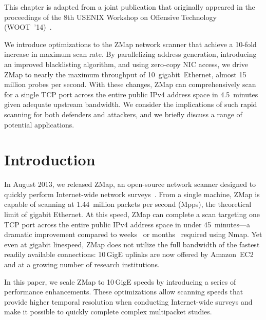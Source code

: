 
This chapter is adapted from a joint publication that originally appeared in
the proceedings of the 8th USENIX Workshop on Offensive Technology
(WOOT~'14)~\cite{zippier-zmap-2014}.

We introduce optimizations to the ZMap network scanner that achieve a 10-fold
increase in maximum scan rate. By parallelizing address generation,
introducing an improved blacklisting algorithm, and using zero-copy NIC
access, we drive ZMap to nearly the maximum throughput of
10~gigabit~Ethernet, almost 15 million probes per second. With these changes,
ZMap can comprehensively scan for a single TCP port across the entire public
IPv4 address space in 4.5~minutes given adequate upstream bandwidth. We
consider the implications of such rapid scanning for both defenders and
attackers, and we briefly discuss a range of potential applications.

\section{Introduction}
\label{sec:introduction}

In August 2013, we released ZMap, an open-source network scanner designed to
quickly perform Internet-wide network surveys~\cite{zmap-2013}. From a single
machine, ZMap is capable of scanning at 1.44~million packets per second
(Mpps), the theoretical limit of gigabit Ethernet. At this speed, ZMap can
complete a scan targeting one TCP port across the entire public IPv4 address
space in under 45~minutes---a dramatic improvement compared to
weeks~\cite{zmap-2013} or months~\cite{ssl-observatory-2010} required using Nmap. Yet
even at gigabit linespeed, ZMap does not utilize the full bandwidth of the
fastest readily available connections: 10\,GigE uplinks are now offered by
Amazon~EC2~\cite{amazon-10g} and at a growing number of research
institutions. 

In this paper, we scale ZMap to 10\,GigE speeds by introducing a series of
performance enhancements. These optimizations allow scanning speeds that
provide higher temporal resolution when conducting Internet-wide surveys and
make it possible to quickly complete complex multipacket studies.

